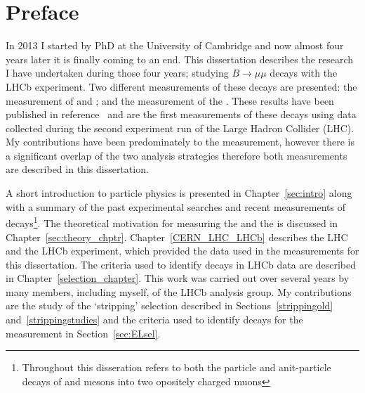 \chapter{Preface}

In 2013 I started by PhD at the University of Cambridge and now almost four years later it is finally coming to an end. This dissertation describes the research I have undertaken during those four years; studying $B \to \mu \mu$ decays with the LHCb experiment. Two different measurements of these decays are presented: the measurement of \bdmumu and \bsmumu \BFs; and the measurement of the \bsmumu \el. These results have been published in reference~\cite{Aaij:2017vad} and are the first measurements of these decays using data collected during the second experiment run of the Large Hadron Collider (LHC). My contributions have been predominately to the \el measurement, however there is a significant overlap of the two analysis strategies therefore both measurements are described in this dissertation.

A short introduction to particle physics is presented in Chapter~\ref{sec:intro} along with a summary of the past experimental searches and recent measurements of \bmumu decays\footnote{Throughout this disseration \bmumu refers to both the particle and anit-particle decays of \bd and \bs mesons into two opositely charged muons}. The theoretical motivation for measuring the \bmumu \BFs and the \bsmumu \el is discussed in Chapter~\ref{sec:theory_chptr}.
Chapter~\ref{CERN_LHC_LHCb} describes the LHC and the LHCb experiment, which provided the data used in the measurements for this dissertation.
The criteria used to identify \bmumu decays in LHCb data are described in Chapter~\ref{selection_chapter}. This work was carried out over several years by many members, including myself, of the \bmumu LHCb analysis group. My contributions are the study of the `stripping' selection described in Sections~\ref{strippingold} and~\ref{strippingstudies} and the criteria used to identify \bsmumu decays for the \el measurement in Section~\ref{sec:ELsel}.

